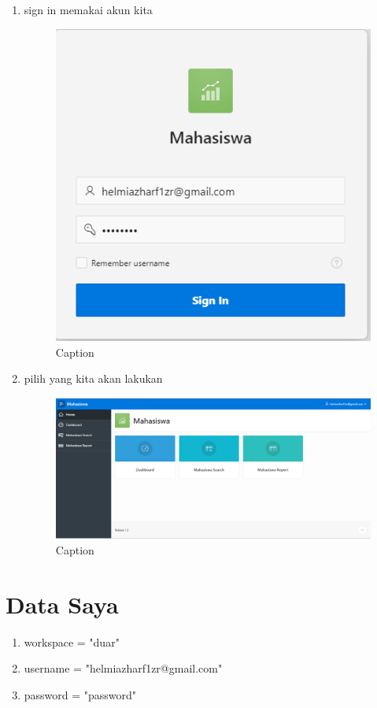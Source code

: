 ﻿\documentclass{article}
\begin{document}
\begin{enumerate}
        \item sign in memakai akun kita
    \begin{figure}
        \centering
        \includegraphics[scale=0.35]{gambar/8.PNG}
        \caption{Caption}
        \label{fig:my_label}
    \end{figure}
    
        \item pilih yang kita akan lakukan
    \begin{figure}
        \centering
        \includegraphics[scale=0.35]{gambar/9.PNG}
        \caption{Caption}
        \label{fig:my_label}
    \end{figure}
    \end{enumerate}
    
\section{Data Saya}
\begin{enumerate}
    \item workspace = "duar"
    \item username = "helmiazharf1zr@gmail.com"
    \item password = "password"
\end{enumerate}

    
\end{document}
